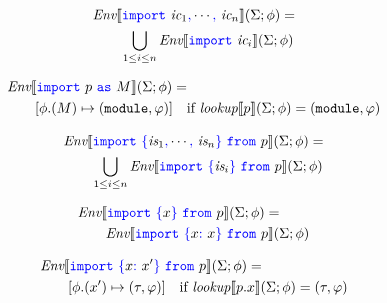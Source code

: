 \documentclass[a4paper]{article}
\newcommand{\code}[1]{\textcolor{blue}{\tt #1}}
\newcommand{\module}{{\tt{module}}}
\newcommand{\Env}{\emph{Env}}
\newcommand{\lookup}{\emph{lookup}}
\newcommand{\If}{\mbox{if}}
\begin{document}
\begin{equation*}
\begin{split}
&\Env \llbracket \code{import}\ \emph{ic}_1\code{,} \cdots\code{,}\ \emph{ic}_n \rrbracket (\Sigma; \phi) = \\
&\qquad\bigcup_{1 \le i \le n} \Env \llbracket \code{import}\ \emph{ic}_i \rrbracket (\Sigma; \phi)
\end{split}
\end{equation*}

\begin{equation*}
\begin{split}
&\Env \llbracket \code{import}\ p\ \code{as}\ M \rrbracket (\Sigma; \phi) = \\
&\qquad [\phi.(M) \mapsto (\module, \varphi)] \quad \If\ \lookup \llbracket p \rrbracket (\Sigma; \phi) = (\module, \varphi)
\end{split}
\end{equation*}

\begin{equation*}
\begin{split}
&\Env \llbracket \code{import}\ \code{\{} \emph{is}_1\code{,} \cdots\code{,}\ \emph{is}_n \code{\}}\ \code{from}\ p \rrbracket (\Sigma; \phi) = \\
&\qquad \bigcup_{1 \le i \le n} \Env \llbracket \code{import}\ \code{\{} \emph{is}_i \code{\}}\ \code{from}\ p \rrbracket (\Sigma; \phi)
\end{split}
\end{equation*}

\begin{equation*}
\begin{split}
&\Env \llbracket \code{import}\ \code{\{} x \code{\}}\ \code{from}\ p \rrbracket (\Sigma; \phi) = \\
&\qquad \Env \llbracket \code{import}\ \code{\{} x\code{:}\ x \code{\}}\ \code{from}\ p \rrbracket (\Sigma; \phi)
\end{split}
\end{equation*}

\begin{equation*}
\begin{split}
&\Env \llbracket \code{import}\ \code{\{} x\code{:}\ x' \code{\}}\ \code{from}\ p \rrbracket (\Sigma; \phi) = \\
&\qquad [\phi.(x') \mapsto (\tau, \varphi)] \quad \If\ \lookup \llbracket p.x \rrbracket (\Sigma; \phi) = (\tau, \varphi)
\end{split}
\end{equation*}
\end{document}
